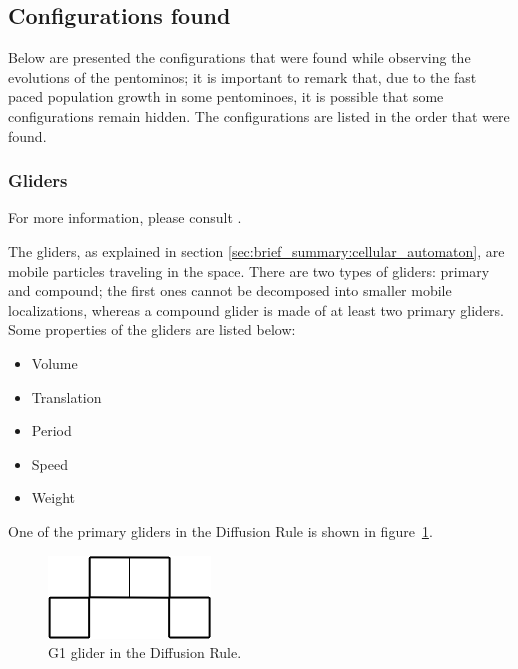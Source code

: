 
\newpage
\subsection{Configurations found}
\label{sec:configurations-found}
Below are presented the configurations that were found while observing the
evolutions of the pentominos; it is important to remark that, due to the
fast paced population growth in some pentominoes, it is possible that some
configurations remain hidden. The configurations are listed in the order that
were found.

\subsubsection{Gliders}

For more information, please consult \cite{j2}.

The gliders, as explained in section \ref{sec:brief_summary:cellular_automaton},
are mobile particles traveling in the space. There are two types of gliders:
primary and compound; the first ones cannot be decomposed into smaller mobile
localizations, whereas a compound glider is made of at least two primary
gliders. Some properties of the gliders are listed below:
\begin{itemize}
  \item Volume
  \item Translation
  \item Period
  \item Speed
  \item Weight
\end{itemize}

One of the primary gliders in the Diffusion Rule is shown in
figure~\ref{fig:dr-glider-1}.

\begin{figure}
	\centering
	\includegraphics[scale=0.5]{df_settings_dd/dr-glider-1.png}
	\caption{G1 glider in the Diffusion Rule.}
  \label{fig:dr-glider-1}
\end{figure}

